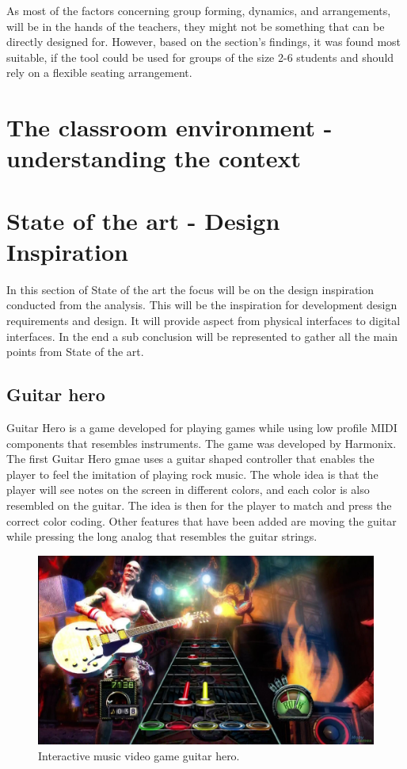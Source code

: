 As most of the factors concerning group forming, dynamics, and arrangements,  will be in the hands of the teachers, they might not be something that can be directly designed for.  
However, based on the section's findings, it was found most suitable, if the tool could be used for groups of the size 2-6 students and should rely on a flexible seating arrangement.
 

\section{The classroom environment -understanding the context} %


\section{State of the art - Design Inspiration}\label{sec:sota}
In this section of State of the art the focus will be on the design inspiration conducted from the analysis. This will be the inspiration for development design requirements and design. It will provide aspect from physical interfaces to digital interfaces. In the end a sub conclusion will be represented to gather all the main points from State of the art. 

\subsection{Guitar hero}\label{sec:guitarHero} 
Guitar Hero is a game developed for playing games while using low profile MIDI components that resembles instruments. The game was developed by Harmonix. The first Guitar Hero gmae uses a guitar shaped controller that enables the player to feel the imitation of playing rock music. The whole idea is that the player will see notes on the screen in different colors, and each color is also resembled on the guitar. The idea is then for the player to match and press the correct color coding. Other features that have been added are moving the guitar while pressing the long analog that resembles the guitar strings. 
\begin{figure}[H]
	\centering
	\includegraphics[width=0.7\linewidth]{figure/Analysis/guitarhero}
	\caption{Interactive music video game guitar hero.}
	\label{fig:guitarHero}
\end{figure}




